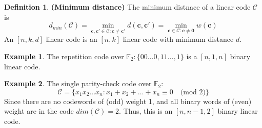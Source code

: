 \documentclass[12pt, oneside]{book}
\theoremstyle{definition}
\newtheorem{definition}{Definition}[section]
\theoremstyle{definition}
\newtheorem{example}{Example}[section]
\theoremstyle{remark}
\begin{document}
\begin{definition}
  \textbf{(Minimum distance)} The minimum distnace of a linear code $\mathcal{C}$ is
  \[
  d_{min}(\mathcal{C})=\min_{\mathbf{c},\mathbf{c'}\in\mathcal{C}:\mathbf{c}\neq \mathbf{c'}} d(\mathbf{c},\mathbf{c'})=\min_{\mathbf{c}\in\mathcal{C}:\mathbf{c}\neq \mathbf{0}}w(\mathbf{c})
  \]
  An $[n,k,d]$ linear code is an $[n,k]$ linear code with minimum distance $d$.
\end{definition}

\begin{example}
    The repetition code over $\mathbb{F}_2 :\{00\ldots0,11\ldots,1\}$ is a $[n,1,n]$ binary linear code.
\end{example}

\begin{example}
    The single parity-check code over $\mathbb{F}_2$:
    \[
    \mathcal{C}=\{x_1x_2\ldots x_n:x_1+x_2+\ldots+x_n\equiv 0\quad \text{(mod 2)}\}
    \]
    Since there are no codewords of (odd) weight 1, and all binary words of (even) weight are in the code $dim(\mathcal{C})=2$. Thus, this is an $[n,n-1,2]$ binary linear code.
\end{example}
\end{document}
